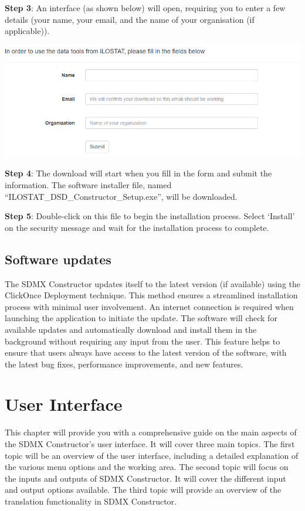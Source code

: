 \documentclass[
]{book}
\begin{document}
\textbf{Step 3}: An interface (as shown below) will open, requiring you to enter a few details (your name, your email, and the name of your organisation (if applicable)).

\begin{center}\includegraphics[width=1\linewidth]{./images/image007} \end{center}

\textbf{Step 4}: The download will start when you fill in the form and submit the information. The software installer file, named ``ILOSTAT\_DSD\_Constructor\_Setup.exe'', will be downloaded.

\textbf{Step 5}: Double-click on this file to begin the installation process. Select `Install' on the security message and wait for the installation process to complete.

\hypertarget{software-updates}{%
\section{Software updates}\label{software-updates}}

The SDMX Constructor updates itself to the latest version (if available) using the ClickOnce Deployment technique. This method ensures a streamlined installation process with minimal user involvement. An internet connection is required when launching the application to initiate the update. The software will check for available updates and automatically download and install them in the background without requiring any input from the user. This feature helps to ensure that users always have access to the latest version of the software, with the latest bug fixes, performance improvements, and new features.

\hypertarget{user-interface}{%
\chapter{User Interface}\label{user-interface}}

This chapter will provide you with a comprehensive guide on the main aspects of the SDMX Constructor's user interface. It will cover three main topics. The first topic will be an overview of the user interface, including a detailed explanation of the various menu options and the working area. The second topic will focus on the inputs and outputs of SDMX Constructor. It will cover the different input and output options available. The third topic will provide an overview of the translation functionality in SDMX Constructor.
\end{document}
